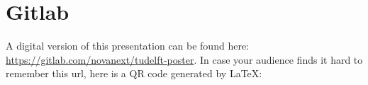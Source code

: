 \documentclass[
  t,%
]{_style/tudelft-beamerposter}
\begin{document}
\begin{frame}
\begin{columns}[onlytextwidth, T]
\begin{column}{}
      \AtNextBibliography{\normalsize}%
      \printbibliography

      \def\enotesize{\normalsize}
      \theendnotes
        
      \section*{Gitlab}
        A digital version of this presentation can be found here:
      \url{https://gitlab.com/novanext/tudelft-poster}.
      In case your audience finds it hard to remember this url, here is a QR code generated by \LaTeX:
  
      \begin{center}
      \end{center}
    \end{column}
  \end{columns}
\end{frame}
\end{document}
